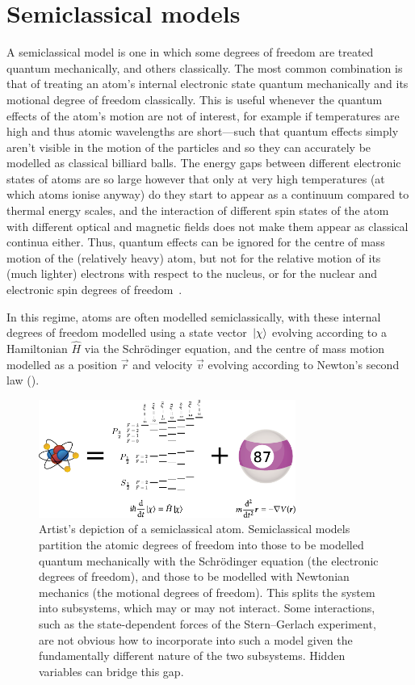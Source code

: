 \section{Semiclassical models}\label{sec:semiclassical_methods}

A semiclassical model is one in which some degrees of freedom are treated quantum mechanically, and others classically. The most common combination is that of treating an atom's internal electronic state quantum mechanically and its motional degree of freedom classically. This is useful whenever the quantum effects of the atom's motion are not of interest, for example if temperatures are high and thus atomic wavelengths are short---such that quantum effects simply aren't visible in the motion of the particles and so they can accurately be modelled as classical billiard balls. The energy gaps between different electronic states of atoms are so large however that only at very high temperatures (at which atoms ionise anyway) do they start to appear as a continuum compared to thermal energy scales, and the interaction of different spin states of the atom with different optical and magnetic fields does not make them appear as classical continua either. Thus, quantum effects can be ignored for the centre of mass motion of the (relatively heavy) atom, but not for the relative motion of its (much lighter) electrons with respect to the nucleus, or for the nuclear and electronic spin degrees of freedom~\cite{doi:10.1063/1.459170}.

In this regime, atoms are often modelled semiclassically, with these internal degrees of freedom modelled using a state vector $\ket\chi$ evolving according to a Hamiltonian $\hat H$ via the Schr\"odinger equation, and the centre of mass motion modelled as a position $\vec r$ and velocity $\vec v$ evolving according to Newton's second law ().

\begin{figure}[t]
    \centerfloat
    \includegraphics[width=0.75\textwidth]{figures/hidden_variables/semiclassical.pdf}
    \caption{Artist's depiction of a semiclassical atom. Semiclassical models partition the atomic degrees of freedom into those to be modelled quantum mechanically with the Schr\"odinger equation (the electronic degrees of freedom), and those to be modelled with Newtonian mechanics (the motional degrees of freedom). This splits the system into subsystems, which may or may not interact. Some interactions, such as the state-dependent forces of the Stern--Gerlach experiment, are not obvious how to incorporate into such a model given the fundamentally different nature of the two subsystems. Hidden variables can bridge this gap.}
    \label{fig:semiclassical}
\end{figure}


